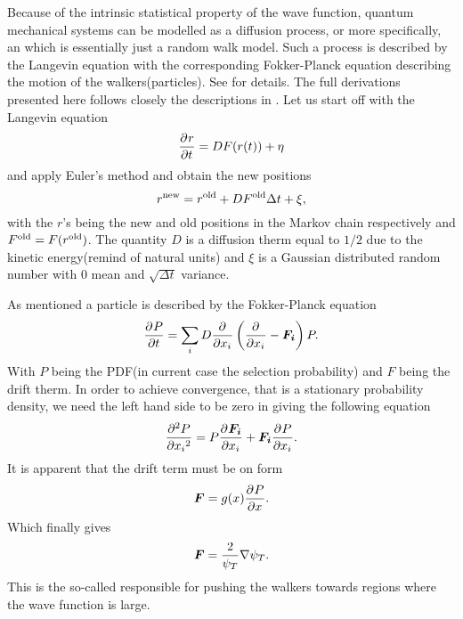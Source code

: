         Because of the intrinsic statistical property of the wave function,
        quantum mechanical systems can be modelled as a diffusion process, or
        more specifically, an  which is
        essentially just a random walk model. Such a process is described by
        the Langevin equation with the corresponding Fokker-Planck equation
        describing the motion of the walkers(particles). See \cite{numstoch,
        compphysThijssen, vmc} for details. The full derivations presented here
        follows closely the descriptions in \cite{compphysThijssen, vmc}. Let
        us start off with the Langevin equation
            \begin{equation}
                \langevin
                \label{eq:langevin}
            \end{equation}
        and apply Euler's method and obtain the new positions
            \begin{equation}
                r^{\text{new}} = r^{\text{old}} + DF^{\text{old}}\Delta t + \xi,
                \label{eq:rnewdef}
            \end{equation}
        with the $r$'s being the new and old positions in the Markov chain
        respectively and $F^{\text{old}}=F(r^{\text{old}})$. The quantity $D$ is a diffusion
        therm equal to $1/2$ due to the kinetic energy(remind of natural units)
        and $\xi$ is a Gaussian distributed random number with $0$ mean and
        $\sqrt{\Delta t}$ variance.

        As mentioned a particle is described by the Fokker-Planck equation
            \begin{equation}
                \FokkerPlanck.
                \label{eq:FokkerPlanckDef}
            \end{equation}
        With $P$ being the PDF(in current case the selection probability) and
        $F$ being the drift therm. In order to achieve convergence, that is a
        stationary probability density, we need the left hand side to be zero
        in  giving the following equation
            \begin{equation}
                \prd{x_i}[P][2] = P\prd{x_i}[\mb{F_i}] + \mb{F_i}\prd{x_i}[P].
            \end{equation}
        It is apparent that the drift term must be on form 
            \begin{equation}
                \mb{F}=g(x)\prd{x}[P].
            \end{equation}
        Which finally gives
            \begin{equation}
                \boldsymbol{{F}} = \frac{2}{\psi_T}\nabla \psi_T.
                \label{eq:qForceDef}
            \end{equation}
        This is the so-called  responsible for pushing the
        walkers towards regions where the wave function is large.


